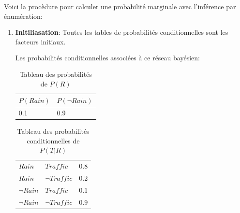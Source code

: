 Voici la procèdure pour calculer une probabilité marginale avec l'inférence par énumération: 

\begin{enumerate}
    \item \textbf{Initiliasation}: Toutes les tables de probabilités conditionnelles sont les facteurs initiaux.

    Les probabilités conditionnelles associées à ce réseau bayésien: 
    \begin{table}[H]
        \centering
        \begin{tabular}{|ll|}
            \hline
            $P(Rain)$ & $P(\neg Rain)$ \\ 
            \hline 
            0.1 & 0.9 \\
            \hline 
        \end{tabular}
        \caption{Tableau des probabilités de $P(R)$}
    \end{table}

    \begin{table}[H]
        \centering
        \begin{tabular}{|l|l|l|}
            \hline
            $Rain$ & $Traffic$ & 0.8 \\ 
            $Rain$ & $\neg Traffic$ & 0.2 \\
            $\neg Rain$ & $Traffic$ & 0.1 \\
            $\neg Rain$ & $\neg Traffic$ & 0.9 \\
            \hline
        \end{tabular}
        \caption{Tableau des probabilités conditionnelles de $P(T | R)$}
    \end{table}


\end{enumerate}
